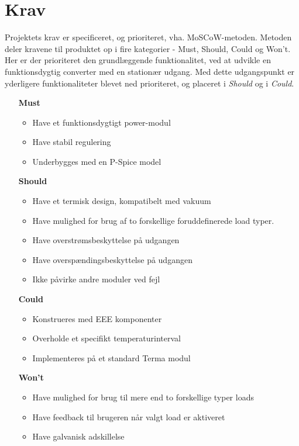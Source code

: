 
\chapter{Krav}
Projektets krav er specificeret, og prioriteret, vha. MoSCoW-metoden\cite{MoSCoW}. Metoden deler kravene til produktet op i fire kategorier - Must, Should, Could og Won't. Her er der prioriteret den grundlæggende funktionalitet, ved at udvikle en funktionsdygtig converter med en stationær udgang. Med dette udgangspunkt er yderligere funktionaliteter blevet ned prioriteret, og placeret i \textit{Should} og i \textit{Could}. 

\begin{itemize}
	\item[\textbf{Must}]
	\begin{itemize}
		\item Have et funktionsdygtigt power-modul
		\item Have stabil regulering
		\item Underbygges med en P-Spice model
		
	\end{itemize}
	\item[\textbf{Should}]
	\begin{itemize}
		\item Have et termisk design, kompatibelt med vakuum
		\item Have mulighed for brug af to forskellige foruddefinerede load typer.
		\item Have overstrømsbeskyttelse på udgangen
		\item Have overspændingsbeskyttelse på udgangen
		\item Ikke påvirke andre moduler ved fejl
		
	\end{itemize}
	\item[\textbf{Could}] 
	\begin{itemize}
		\item Konstrueres med EEE komponenter
		\item Overholde et specifikt temperaturinterval
		\item Implementeres på et standard Terma modul 
		
	\end{itemize}
	\item[\textbf{Won't}]
	\begin{itemize}
		\item Have mulighed for brug til mere end to forskellige typer loads
		\item Have feedback til brugeren når valgt load er aktiveret
		\item Have galvanisk adskillelse
		
	\end{itemize}
\end{itemize}

